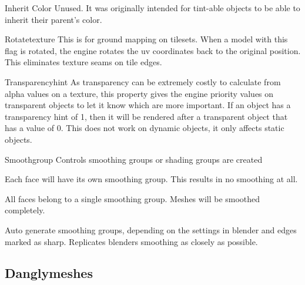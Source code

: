 \begin{propertyAurora}{Inherit Color}
Unused. It was originally intended for tint-able objects to be 
able to inherit their parent's color.
\end{propertyAurora}

\begin{propertyAurora}{Rotatetexture}
This is for ground mapping on tilesets. When a model with
this flag is rotated, the engine rotates the uv coordinates back 
to the original position. This eliminates texture seams on tile edges.
\end{propertyAurora}

\begin{propertyAurora}{Transparencyhint}
As transparency can be extremely costly to calculate from alpha values on a
texture, this property gives the engine priority values on transparent objects to let it
know which are more important. If an object has a transparency hint of 1, then it
will be rendered after a transparent object that has a value of 0. This does not work 
on dynamic objects, it only affects static objects.
\end{propertyAurora}

\begin{propertyAurora}{Smoothgroup}
Controls smoothing groups or shading groups are created
\begin{description}[leftmargin=6em,style=nextline]
    \item[Separate] Each face will have its own smoothing group. This results in no smoothing at all.
    \item[Single] All faces belong to a single smoothing group. Meshes will be smoothed completely.
    \item[Auto] Auto generate smoothing groups, depending on the settings in blender and edges marked as sharp. Replicates blenders smoothing as closely as possible.
\end{description}
\end{propertyAurora}


\subsection{Danglymeshes}

